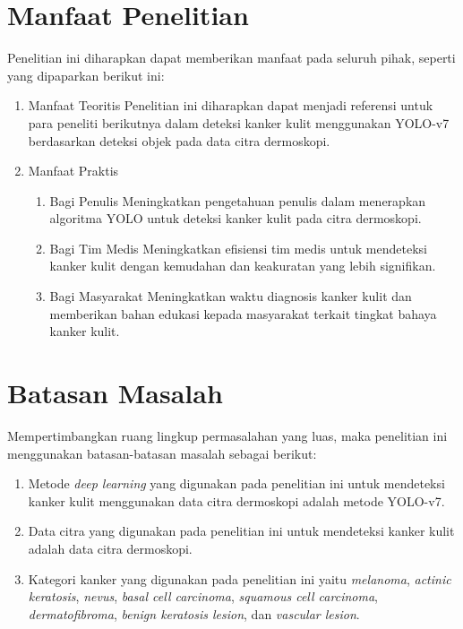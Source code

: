     \section{Manfaat Penelitian}
    Penelitian ini diharapkan dapat memberikan manfaat pada seluruh pihak, seperti yang dipaparkan berikut ini:
    \begin{enumerate}
        \item Manfaat Teoritis
        Penelitian ini diharapkan dapat menjadi referensi untuk para peneliti berikutnya dalam deteksi kanker kulit menggunakan YOLO-v7 berdasarkan deteksi objek pada data citra dermoskopi.

        \item Manfaat Praktis
        \begin{enumerate}
            \item Bagi Penulis
            Meningkatkan pengetahuan penulis dalam menerapkan algoritma YOLO untuk deteksi kanker kulit pada citra dermoskopi.

            \item Bagi Tim Medis
            Meningkatkan efisiensi tim medis untuk mendeteksi kanker kulit dengan kemudahan dan keakuratan yang lebih signifikan.

            \item Bagi Masyarakat
            Meningkatkan waktu diagnosis kanker kulit dan memberikan bahan edukasi kepada masyarakat terkait tingkat bahaya kanker kulit.
        \end{enumerate}
    \end{enumerate}

    \section{Batasan Masalah}
    Mempertimbangkan ruang lingkup permasalahan yang luas, maka penelitian ini menggunakan batasan-batasan masalah sebagai berikut:
    \begin{enumerate}
        \item Metode \textit{deep learning} yang digunakan pada penelitian ini untuk mendeteksi kanker kulit menggunakan data citra dermoskopi adalah metode YOLO-v7.
        \item Data citra yang digunakan pada penelitian ini untuk mendeteksi kanker kulit adalah data citra dermoskopi.
        \item Kategori kanker yang digunakan pada penelitian ini yaitu \textit{melanoma}, \textit{actinic keratosis}, \textit{nevus}, \textit{basal cell carcinoma}, \textit{squamous cell carcinoma}, \textit{dermatofibroma}, \textit{benign keratosis lesion}, dan \textit{vascular lesion}.
    \end{enumerate}

